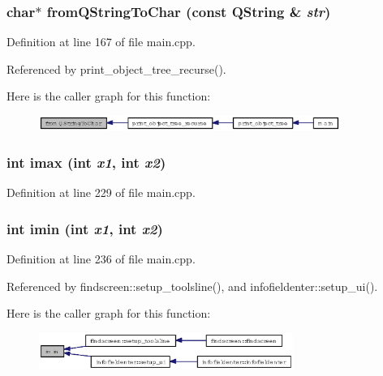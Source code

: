 \subsubsection{\setlength{\rightskip}{0pt plus 5cm}char$\ast$ from\-QString\-To\-Char (const QString \& {\em str})}\label{main_8cpp_0dda5f4014a4e3496449270026f6c149}




Definition at line 167 of file main.cpp.

Referenced by print\_\-object\_\-tree\_\-recurse().

Here is the caller graph for this function:\begin{figure}[H]
\begin{center}
\leavevmode
\includegraphics[width=278pt]{main_8cpp_0dda5f4014a4e3496449270026f6c149_icgraph}
\end{center}
\end{figure}
\subsubsection{\setlength{\rightskip}{0pt plus 5cm}int imax (int {\em x1}, int {\em x2})}\label{main_8cpp_99d8888037c7927cbe6362f80a2f6f8b}




Definition at line 229 of file main.cpp.
\subsubsection{\setlength{\rightskip}{0pt plus 5cm}int imin (int {\em x1}, int {\em x2})}\label{main_8cpp_6c9ac00d126f1109a583b5264a07412a}




Definition at line 236 of file main.cpp.

Referenced by findscreen::setup\_\-toolsline(), and infofieldenter::setup\_\-ui().

Here is the caller graph for this function:\begin{figure}[H]
\begin{center}
\leavevmode
\includegraphics[width=235pt]{main_8cpp_6c9ac00d126f1109a583b5264a07412a_icgraph}
\end{center}
\end{figure}
